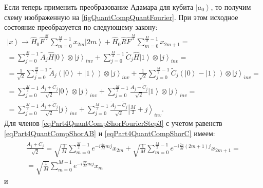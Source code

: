 

Если теперь применить преобразование Адамара для кубита
$\left|a_0\right>$, то получим схему изображенную на
\autoref{figQuantCompQuantFourier}. При этом исходное состояние
преобразуется по следующему закону:
\begin{eqnarray}
\left|x\right> \rightarrow
\hat{H}_0\hat{F}^{\frac{M}{2}} \sum_{m = 0}^{\frac{M}{2} - 1}x_{2m} \left|2m\right> +
\hat{H}_0\hat{R}\hat{F}^{\frac{M}{2}}\sum_{m = 0}^{\frac{M}{2} - 1} x_{2m + 1} =
\nonumber \\
=
\sum_{j = 0}^{\frac{M}{2} - 1}
\tilde{A}_{j}
\hat{H}\left|0\right> \otimes \left|j\right>_{inv}
+
\sum_{j = 0}^{\frac{M}{2} - 1} 
\tilde{C}_{j}
\hat{H}\left|1\right> \otimes \left|j\right>_{inv} 
=
\nonumber \\
= 
\frac{1}{\sqrt{2}}\sum_{j = 0}^{\frac{M}{2} - 1}
\tilde{A}_{j} 
\left(\left|0\right> + \left|1\right> \right) \otimes  
\left|j\right>_{inv}
+
\frac{1}{\sqrt{2}}\sum_{j = 0}^{\frac{M}{2} - 1}
\tilde{C}_{j} 
\left(\left|0\right> - \left|1\right> \right) \otimes  
\left|j\right>_{inv}
=
\nonumber \\
=
\sum_{j = 0}^{\frac{M}{2} - 1}
\frac{\tilde{A}_{j} + \tilde{C}_{j} }{\sqrt{2}} 
\left|0\right> \otimes \left|j\right>_{inv} +
\sum_{j = 0}^{\frac{M}{2} - 1}
\frac{ \tilde{A}_{j} - \tilde{C}_{j}}{\sqrt{2}} 
\left|1\right> \otimes \left|j\right>_{inv}
=
\nonumber \\
=
\sum_{j = 0}^{\frac{M}{2} - 1}
\frac{\tilde{A}_{j} + \tilde{C}_{j} }{\sqrt{2}} \left|j\right>_{inv} +
\sum_{j = 0}^{\frac{M}{2} - 1}
\frac{ \tilde{A}_{j} - \tilde{C}_{j}}{\sqrt{2}} 
\left|\frac{M}{2} + j \right>_{inv}.
\label{eqPart4QuantCompShorFourierStep3}
\end{eqnarray}
Для членов \eqref{eqPart4QuantCompShorFourierStep3} с учетом равенств
\eqref{eqPart4QuantCompShorAB} и \eqref{eqPart4QuantCompShorC} имеем:
\begin{eqnarray}
\frac{\tilde{A}_{j} + \tilde{C}_{j} }{\sqrt{2}} = 
\sqrt{\frac{1}{M}} 
\sum_{m = 0}^{\frac{M}{2} - 1} e^{-i \frac{4 \pi}{M} m j} x_{2m}  +
\sqrt{\frac{1}{M}} 
\sum_{m = 0}^{\frac{M}{2} - 1} 
e^{-i \frac{2 \pi}{M} \left(2m+1\right) j} x_{2m+1} = 
\nonumber \\
=
\sqrt{\frac{1}{M}} \sum_{m = 0}^{M - 1}
e^{-i \frac{2 \pi}{M} m j} x_{m}
\label{eqPart4QuantCompShorFourierStep3_1}
\end{eqnarray}
и
